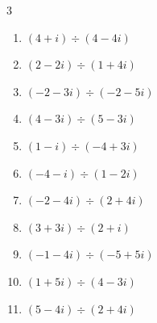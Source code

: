 \begin{multicols}{3}
\begin{enumerate}

\columnbreak %

\resetques

  \item $\displaystyle (4+i)\div(4-4i)$


  \item $\displaystyle (2-2i)\div(1+4i)$


  \item $\displaystyle (-2-3i)\div(-2-5i)$


  \item $\displaystyle (4-3i)\div(5-3i)$


  \item $\displaystyle (1-i)\div(-4+3i)$


  \item $\displaystyle (-4-i)\div(1-2i)$


  \item $\displaystyle (-2-4i)\div(2+4i)$

        \phantom{$\displaystyle =-1$}

  \item $\displaystyle (3+3i)\div(2+i)$


  \item $\displaystyle (-1-4i)\div(-5+5i)$


  \item $\displaystyle (1+5i)\div(4-3i)$


\columnbreak %

  \item $\displaystyle (5-4i)\div(2+4i)$


\end{enumerate}
\end{multicols}
